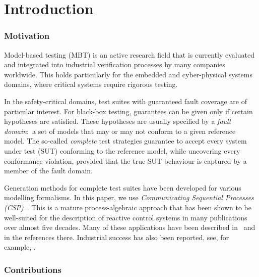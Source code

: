 
\section{Introduction}
\label{sec:intro}


\subsubsection*{Motivation}

Model-based testing (MBT) is an  active research field that is currently
evaluated and integrated into industrial verification processes by many
companies worldwide. This holds particularly for the embedded and
cyber-physical systems domains, where critical systems require rigorous
testing.


In the safety-critical domains, test suites with guaranteed fault coverage
are of particular interest. For black-box testing, guarantees can be given
only if certain hypotheses are satisfied. These hypotheses are usually
specified by a \emph{fault domain}:~a set of models that may or may not
conform to a given reference model. 
The so-called \emph{complete} test strategies guarantee
to accept every  system under test (SUT) conforming to the reference model, while  uncovering every conformance violation, provided that the true SUT behaviour is captured by a member of the
fault domain.

Generation methods for complete test suites have been developed for various
modelling formalisms. In this paper, we use \emph{Communicating Sequential
Processes (CSP)}~\cite{Hoare:1985:CSP:3921,Roscoe2010}. This is a mature
process-algebraic approach that has been shown to be well-suited for the
description of reactive control systems in many publications over almost five
decades. Many of these applications have
been described in~\cite{Roscoe2010} and in the references there.
Industrial success has also been reported, see, for example, \cite{976937,DBLP:conf/prdc/ShiPK99,DBLP:conf/amast/ButhKPS97}.


\subsubsection*{Contributions}

